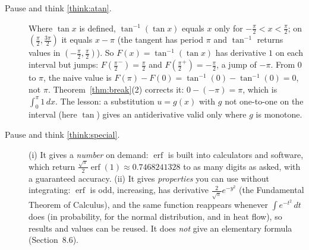 \documentclass[11pt]{article}
\begin{document}
\begin{description}
  \item[Pause and think \ref{think:atan}.] Where $\tan x$ is defined, $\tan^{-1}(\tan x)$ equals $x$ only for $-\frac\pi2<x<\frac\pi2$; on $\left(\frac\pi2,\frac{3\pi}2\right)$ it equals $x-\pi$ (the tangent has period $\pi$ and $\tan^{-1}$ returns values in $\left(-\frac\pi2,\frac\pi2\right)$). So $F(x)=\tan^{-1}(\tan x)$ has derivative $1$ on each interval but jumps: $F\left(\frac\pi2^-\right)=\frac\pi2$ and $F\left(\frac\pi2^+\right)=-\frac\pi2$, a jump of $-\pi$. From $0$ to $\pi$, the naive value is $F(\pi)-F(0)=\tan^{-1}(0)-\tan^{-1}(0)=0$, not $\pi$. Theorem~\ref{thm:break}(2) corrects it: $0-(-\pi)=\pi$, which is $\int_0^\pi1\,dx$. The lesson: a substitution $u=g(x)$ with $g$ not one-to-one on the interval (here $\tan$) gives an antiderivative valid only where $g$ is monotone.

  \item[Pause and think \ref{think:special}.] (i) It gives a \emph{number} on demand: $\operatorname{erf}$ is built into calculators and software, which return $\frac{\sqrt\pi}2\operatorname{erf}(1)\approx0.7468241328$ to as many digits as asked, with a guaranteed accuracy. (ii) It gives \emph{properties} you can use without integrating: $\operatorname{erf}$ is odd, increasing, has derivative $\frac2{\sqrt\pi}e^{-y^2}$ (the Fundamental Theorem of Calculus), and the same function reappears whenever $\int e^{-t^2}\,dt$ does (in probability, for the normal distribution, and in heat flow), so results and values can be reused. It does \emph{not} give an elementary formula (Section~8.6).
\end{description}
\end{document}

